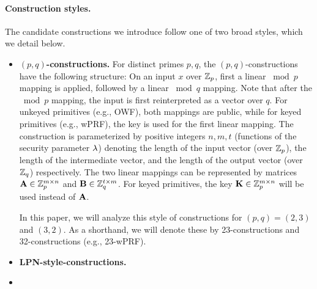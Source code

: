 


\paragraph{Construction styles.}
The candidate constructions we introduce follow one of two broad styles, which we detail below.

\begin{itemize}
    \item \textbf{$(p,q)$-constructions.}
    For distinct primes $p, q$, the $(p,q)$-constructions have the following structure: On an input $x$ over $\mathbb{Z}_p$, first a linear $\bmod p$ mapping is applied, followed by a linear $\bmod q$ mapping. Note that after the $\bmod p$ mapping, the input is first reinterpreted as a vector over $q$. For unkeyed primitives (e.g., OWF), both mappings are public, while for keyed primitives (e.g., wPRF), the key is used for the first linear mapping. The construction is parameterized by positive integers $n, m, t$ (functions of the security parameter $\lambda$) denoting the length of the input vector (over $\mathbb{Z}_p$), the length of the intermediate vector, and the length of the output vector (over $\mathbb{Z}_q$) respectively. The two linear mappings can be represented by matrices $\mat{A} \in \Z_p^{m \times n}$ and $\mat{B} \in \Z_q^{t \times m}$. For keyed primitives, the key $\mat{K} \in \Z_p^{m \times n}$ will be used instead of $\mat{A}$.


    In this paper, we will analyze this style of constructions for $(p,q) = (2,3)$ and $(3,2)$. As a shorthand, we will denote these by 23-constructions and 32-constructions (e.g., 23-wPRF).


    \item \textbf{LPN-style-constructions.} 

    \item {}
\end{itemize}




\newpage




